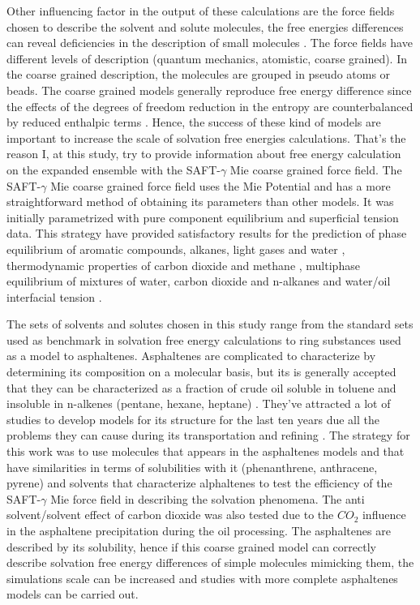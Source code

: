 Other influencing factor in the output of these calculations are the force fields chosen to describe the solvent and solute molecules, the free energies differences  can reveal deficiencies in the description of small molecules \cite{mobley2007,shirts2013}. The force fields have different levels of description (quantum mechanics, atomistic, coarse grained). In the coarse grained description, the molecules are grouped in pseudo atoms or beads. The coarse grained models generally reproduce free energy difference since the effects of the degrees of freedom reduction  in the entropy are counterbalanced by reduced enthalpic terms \cite{kmiecik2016}. Hence, the success of these kind of models are important to  increase the scale of solvation free energies calculations. That's the reason I, at this study, try to provide information about free energy calculation on the expanded ensemble with the SAFT-$\gamma$ Mie coarse grained force field. The SAFT-$\gamma$ Mie coarse grained force field uses the Mie Potential \cite{MIE} and has a more straightforward method of obtaining its parameters than other models. It was initially parametrized with pure component equilibrium and superficial tension data. This strategy have provided satisfactory results for the prediction of phase equilibrium of aromatic compounds, alkanes, light gases and water \cite{herdes2015,muller2017,lobanova2015} , thermodynamic properties of carbon dioxide and methane \cite{cassiano1}, multiphase equilibrium of mixtures of water, carbon dioxide and n-alkanes \cite{lobanova2016} and water/oil interfacial tension \cite{herdes2017}.  

The sets of solvents and solutes chosen in this study range from the standard sets used as benchmark in solvation free energy calculations to ring substances used as a model to asphaltenes. Asphaltenes are complicated to characterize by determining its composition on a molecular basis, but its is generally accepted that they can be characterized as a fraction of crude oil soluble in toluene and insoluble in n-alkenes (pentane, hexane, heptane) \cite{SJOBLOM2003399}. They've attracted a  lot of studies to develop models for its structure for the last ten years  due all the problems they can cause during its transportation and refining \cite{SJOBLOM20151}. The strategy for this work was to use molecules that appears in the asphaltenes models and that have similarities in terms of solubilities with it (phenanthrene, anthracene, pyrene) and solvents that characterize alphaltenes to test the efficiency of the SAFT-$\gamma$ Mie force field in describing the solvation phenomena. The anti solvent/solvent effect of carbon dioxide was also tested due to the $CO_{2}$ influence in the asphaltene precipitation during the oil processing. The asphaltenes are described by its solubility, hence if this coarse grained model can correctly describe solvation free energy differences of simple molecules mimicking them, the simulations scale can be increased and studies with more complete asphaltenes models can be carried out.

